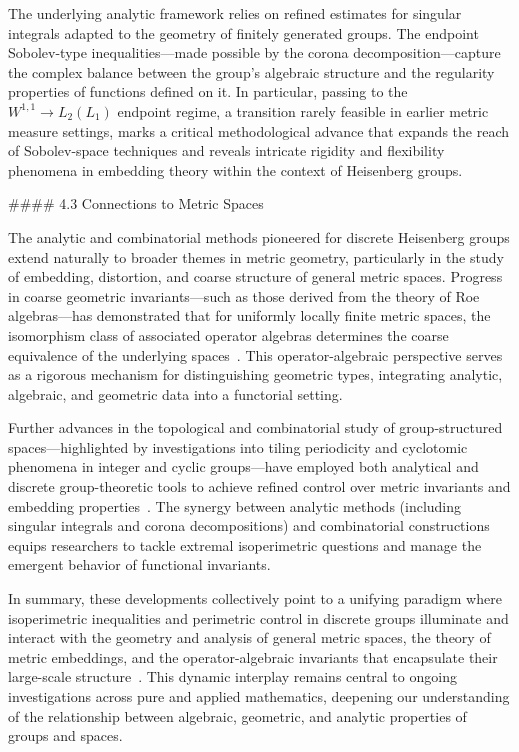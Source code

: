 \documentclass[11pt]{article}
\begin{document}
The underlying analytic framework relies on refined estimates for singular integrals adapted to the geometry of finitely generated groups. The endpoint Sobolev-type inequalities—made possible by the corona decomposition—capture the complex balance between the group's algebraic structure and the regularity properties of functions defined on it. In particular, passing to the $W^{1,1} \rightarrow L_2(L_1)$ endpoint regime, a transition rarely feasible in earlier metric measure settings, marks a critical methodological advance that expands the reach of Sobolev-space techniques and reveals intricate rigidity and flexibility phenomena in embedding theory within the context of Heisenberg groups.

#### 4.3 Connections to Metric Spaces

The analytic and combinatorial methods pioneered for discrete Heisenberg groups extend naturally to broader themes in metric geometry, particularly in the study of embedding, distortion, and coarse structure of general metric spaces. Progress in coarse geometric invariants—such as those derived from the theory of Roe algebras—has demonstrated that for uniformly locally finite metric spaces, the isomorphism class of associated operator algebras determines the coarse equivalence of the underlying spaces~\cite{ref51}. This operator-algebraic perspective serves as a rigorous mechanism for distinguishing geometric types, integrating analytic, algebraic, and geometric data into a functorial setting.

Further advances in the topological and combinatorial study of group-structured spaces—highlighted by investigations into tiling periodicity and cyclotomic phenomena in integer and cyclic groups—have employed both analytical and discrete group-theoretic tools to achieve refined control over metric invariants and embedding properties~\cite{ref52}. The synergy between analytic methods (including singular integrals and corona decompositions) and combinatorial constructions equips researchers to tackle extremal isoperimetric questions and manage the emergent behavior of functional invariants.

In summary, these developments collectively point to a unifying paradigm where isoperimetric inequalities and perimetric control in discrete groups illuminate and interact with the geometry and analysis of general metric spaces, the theory of metric embeddings, and the operator-algebraic invariants that encapsulate their large-scale structure~\cite{ref51,ref52,ref108}. This dynamic interplay remains central to ongoing investigations across pure and applied mathematics, deepening our understanding of the relationship between algebraic, geometric, and analytic properties of groups and spaces.
\end{document}
